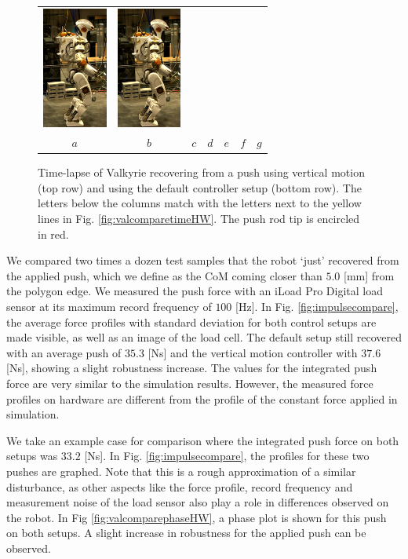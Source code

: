 \documentclass[letterpaper, 10 pt, conference]{ieeeconf}  %
\begin{document}
\begin{figure}[h]
\begin{tabular}{ccccccc}
    \includegraphics[width=0.84in]{val6d_30} &
    \includegraphics[width=0.84in]{val7d_30} \\
    $a$&
    $b$&
    $c$&
    $d$&
    $e$&
    $f$&
    $g$\\
  \end{tabular}
  \caption{Time-lapse of Valkyrie recovering from a push using vertical motion (top row) and using the default controller setup (bottom row). The letters below the columns match with the letters next to the yellow lines in Fig. \ref{fig:valcomparetimeHW}. The push rod tip is encircled in red.}
  \label{fig:val}
\end{figure}
We compared two times a dozen test samples that the robot `just' recovered from the applied push, which we define as the CoM coming closer than $5.0$ [mm] from the polygon edge. We measured the push force with an iLoad Pro Digital load sensor at its maximum record frequency of $100$ [Hz]. In Fig. \ref{fig:impulsecompare}, the average force profiles with standard deviation for both control setups are made visible, as well as an image of the load cell. The default setup still recovered with an average push of $35.3$ [Ns] and the vertical motion controller with $37.6$ [Ns], showing a slight robustness increase. The values for the integrated push force are very similar to the simulation results. However, the measured force profiles on hardware are different from the profile of the constant force applied in simulation.

We take an example case for comparison where the integrated push force on both setups was $33.2$ [Ns]. In Fig. \ref{fig:impulsecompare}, the profiles for these two pushes are graphed. Note that this is a rough approximation of a similar disturbance, as other aspects like the force profile, record frequency and measurement noise of the load sensor also play a role in differences observed on the robot. In Fig \ref{fig:valcomparephaseHW}, a phase plot is shown for this push on both setups. A slight increase in robustness for the applied push can be observed.
\end{document}
